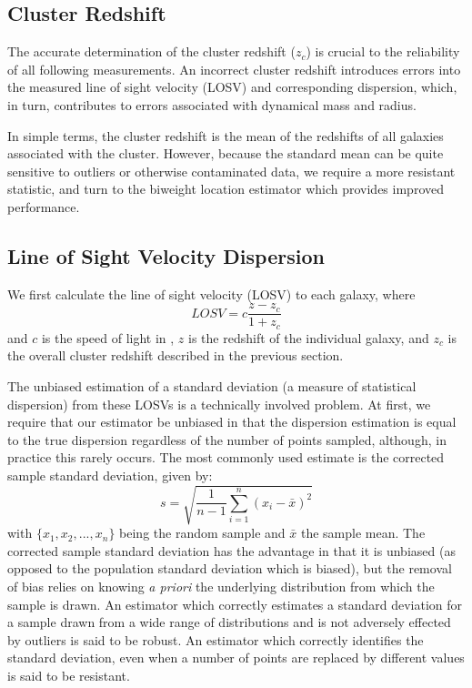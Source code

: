 \documentclass[apj, revtex4]{emulateapj}
\begin{document}
\subsection{Cluster Redshift}
The accurate determination of the cluster redshift ($z_c$) is crucial to the reliability of all following measurements. An incorrect cluster redshift introduces errors into the measured line of sight velocity (LOSV) and corresponding dispersion, which, in turn, contributes to errors associated with dynamical mass and radius. 

In simple terms, the cluster redshift is the  mean of the redshifts of all galaxies associated with the cluster. However, because the standard mean can be quite sensitive to outliers or otherwise contaminated data, we require a more resistant statistic, and turn to the biweight location estimator \citep{Beers1990} which provides improved performance. 

\subsection{Line of Sight Velocity Dispersion}\label{sec:LOSVD}
We first calculate the line of sight velocity (LOSV) to each galaxy, where
\begin{equation}
	LOSV = c\frac{z - z_c}{1+z_c}
\end{equation}
and $c$ is the speed of light in \kms, $z$ is the redshift of the individual galaxy, and $z_c$ is the overall cluster redshift described in the previous section.

The unbiased estimation of a standard deviation (a measure of statistical dispersion) from these LOSVs is a technically involved problem. At first, we require that our estimator be unbiased in that the dispersion estimation is equal to the true dispersion regardless of the number of points sampled, although, in practice this rarely occurs. The most commonly used estimate is the corrected sample standard deviation, given by:
\begin{equation}
	s = \sqrt{\frac{1}{n-1} \sum_{i=1}^n (x_i - \bar{x})^2}
\end{equation}
with $\{x_1, x_2, ..., x_n\}$ being the random sample and $\bar{x}$ the sample mean. The corrected sample standard deviation has the advantage in that it is unbiased (as opposed to the population standard deviation which is biased), but the removal of bias relies on knowing \textit{a priori} the underlying distribution from which the sample is drawn. An estimator which correctly estimates a standard deviation for a sample drawn from a wide range of distributions and is not adversely effected by outliers is said to be robust. An estimator which correctly identifies the standard deviation, even when a number of points are replaced by different values is said to be resistant.
\end{document}
